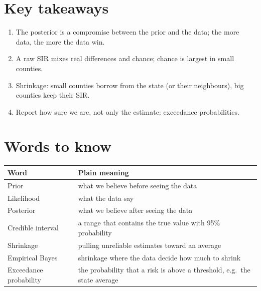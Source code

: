 \documentclass[
  letterpaper,
  DIV=11,
  numbers=noendperiod]{scrartcl}
\providecommand{\tightlist}{%
  \setlength{\itemsep}{0pt}\setlength{\parskip}{0pt}}
\begin{document}
\section*{Key takeaways}\label{key-takeaways}

\begin{enumerate}
\def\labelenumi{\arabic{enumi}.}
\tightlist
\item
  The posterior is a compromise between the prior and the data; the more
  data, the more the data win.
\item
  A raw SIR mixes real differences and chance; chance is largest in
  small counties.
\item
  Shrinkage: small counties borrow from the state (or their neighbours),
  big counties keep their SIR.
\item
  Report how sure we are, not only the estimate: exceedance
  probabilities.
\end{enumerate}

\section*{Words to know}\label{words-to-know}

\begin{longtable}[]{@{}
  >{\raggedright\arraybackslash}p{}
  >{\raggedright\arraybackslash}p{}@{}}
\toprule\noalign{}
\begin{minipage}[b]{\linewidth}\raggedright
Word
\end{minipage} & \begin{minipage}[b]{\linewidth}\raggedright
Plain meaning
\end{minipage} \\
\midrule\noalign{}
\endhead
\bottomrule\noalign{}
\endlastfoot
Prior & what we believe before seeing the data \\
Likelihood & what the data say \\
Posterior & what we believe after seeing the data \\
Credible interval & a range that contains the true value with 95\%
probability \\
Shrinkage & pulling unreliable estimates toward an average \\
Empirical Bayes & shrinkage where the data decide how much to shrink \\
Exceedance probability & the probability that a risk is above a
threshold, e.g.~the state average \\
\end{longtable}
\end{document}
